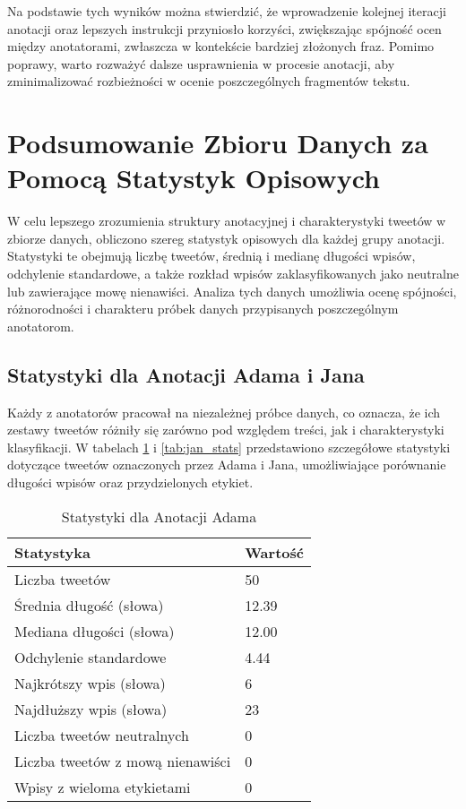 \documentclass[12pt]{article}
\begin{document}
Na podstawie tych wyników można stwierdzić, że wprowadzenie kolejnej iteracji anotacji oraz lepszych instrukcji przyniosło korzyści, zwiększając spójność ocen między anotatorami, zwłaszcza w kontekście bardziej złożonych fraz. Pomimo poprawy, warto rozważyć dalsze usprawnienia w procesie anotacji, aby zminimalizować rozbieżności w ocenie poszczególnych fragmentów tekstu.


\section{Podsumowanie Zbioru Danych za Pomocą Statystyk Opisowych}

W celu lepszego zrozumienia struktury anotacyjnej i charakterystyki tweetów w zbiorze danych, obliczono szereg statystyk opisowych dla każdej grupy anotacji. Statystyki te obejmują liczbę tweetów, średnią i medianę długości wpisów, odchylenie standardowe, a także rozkład wpisów zaklasyfikowanych jako neutralne lub zawierające mowę nienawiści. Analiza tych danych umożliwia ocenę spójności, różnorodności i charakteru próbek danych przypisanych poszczególnym anotatorom.

\subsection{Statystyki dla Anotacji Adama i Jana}

Każdy z anotatorów pracował na niezależnej próbce danych, co oznacza, że ich zestawy tweetów różniły się zarówno pod względem treści, jak i charakterystyki klasyfikacji. W tabelach \ref{tab:adam_stats} i \ref{tab:jan_stats} przedstawiono szczegółowe statystyki dotyczące tweetów oznaczonych przez Adama i Jana, umożliwiające porównanie długości wpisów oraz przydzielonych etykiet.

\begin{table}[h]
    \centering
    \caption{Statystyki dla Anotacji Adama}
    \label{tab:adam_stats}
    \begin{tabular}{|l|l|}
        \hline
        Statystyka & Wartość \\ \hline
        Liczba tweetów & 50 \\ \hline
        Średnia długość (słowa) & 12.39 \\ \hline
        Mediana długości (słowa) & 12.00 \\ \hline
        Odchylenie standardowe & 4.44 \\ \hline
        Najkrótszy wpis (słowa) & 6 \\ \hline
        Najdłuższy wpis (słowa) & 23 \\ \hline
        Liczba tweetów neutralnych & 0 \\ \hline
        Liczba tweetów z mową nienawiści & 0 \\ \hline
        Wpisy z wieloma etykietami & 0 \\ \hline
    \end{tabular}
\end{table}
\end{document}
